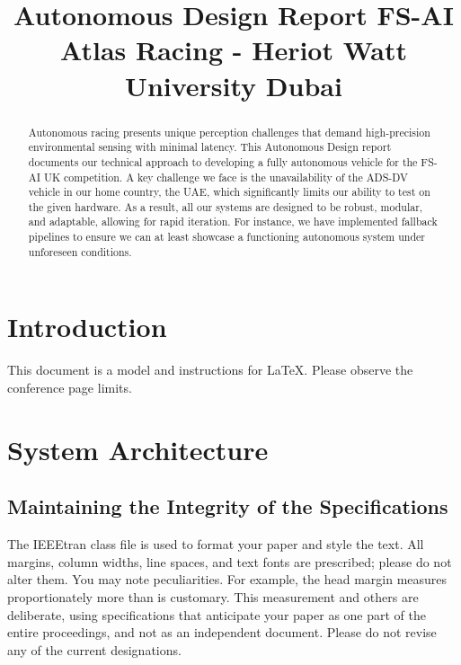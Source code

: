 \documentclass[conference]{IEEEtran}
\begin{document}
\title{Autonomous Design Report FS-AI\\[-0.3em]
{\Large Atlas Racing - Heriot Watt University Dubai}\\[-0.6em]
}

\author{
}

\maketitle

\begin{abstract}
Autonomous racing presents unique perception challenges that demand high-precision environmental sensing with minimal latency. This Autonomous Design report documents our technical approach to developing a fully autonomous vehicle for the FS-AI UK competition. A key challenge we face is the unavailability of the ADS-DV vehicle in our home country, the UAE, which significantly limits our ability to test on the given hardware. As a result, all our systems are designed to be robust, modular, and adaptable, allowing for rapid iteration. For instance, we have implemented fallback pipelines to ensure we can at least showcase a functioning autonomous system under unforeseen conditions.
\end{abstract}

\section{Introduction}
This document is a model and instructions for \LaTeX.
Please observe the conference page limits. 

\section{System Architecture}

\subsection{Maintaining the Integrity of the Specifications}

The IEEEtran class file is used to format your paper and style the text. All margins, 
column widths, line spaces, and text fonts are prescribed; please do not 
alter them. You may note peculiarities. For example, the head margin
measures proportionately more than is customary. This measurement
and others are deliberate, using specifications that anticipate your paper
as one part of the entire proceedings, and not as an independent document. 
Please do not revise any of the current designations.
\end{document}
